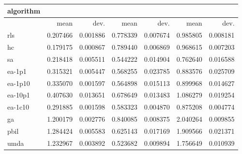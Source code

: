 \begin{tabular}{@{}l*{6}{>{{}}N{1}{2}}@{}}
\toprule
{algorithm} &  &  &  \\
\midrule
& {mean} & {dev.} & {mean} & {dev.} & {mean} & {dev.} \\
\midrule
rls & 0.207466 & 0.001886 & 0.778339 & 0.007674 & 0.985805 & 0.008181 \\
 hc & 0.179175 & 0.000867 & 0.789440 & 0.006869 & 0.968615 & 0.007203 \\
 sa & 0.218418 & 0.005511 & 0.544222 & 0.014904 & 0.762640 & 0.016588 \\
 ea-1p1 & 0.315321 & 0.005447 & 0.568255 & 0.023785 & 0.883576 & 0.025709 \\
 ea-1p10 & 0.335070 & 0.001597 & 0.564898 & 0.015113 & 0.899968 & 0.014627 \\
 ea-10p1 & 0.407630 & 0.013651 & 0.678649 & 0.013483 & 1.086279 & 0.019254 \\
 ea-1c10 & 0.291885 & 0.001598 & 0.583323 & 0.004870 & 0.875208 & 0.004774 \\
 ga & 1.200179 & 0.002776 & 0.840085 & 0.008375 & 2.040264 & 0.009855 \\
 pbil & 1.284424 & 0.005583 & 0.625143 & 0.017169 & 1.909566 & 0.021371 \\
 umda & 1.232967 & 0.003892 & 0.523682 & 0.009894 & 1.756649 & 0.010939 \\
 \bottomrule
\end{tabular}
